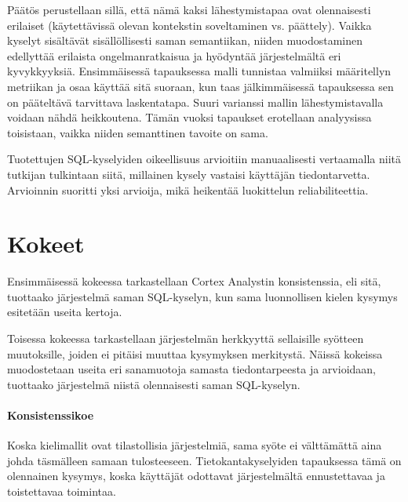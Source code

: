Päätös perustellaan sillä, että nämä kaksi lähestymistapaa ovat olennaisesti erilaiset (käytettävissä olevan kontekstin soveltaminen vs. päättely). Vaikka kyselyt sisältävät sisällöllisesti saman semantiikan, niiden muodostaminen edellyttää erilaista ongelmanratkaisua ja hyödyntää järjestelmältä eri kyvykkyyksiä. Ensimmäisessä tapauksessa malli tunnistaa valmiiksi määritellyn metriikan ja osaa käyttää sitä suoraan, kun taas jälkimmäisessä tapauksessa sen on pääteltävä tarvittava laskentatapa. Suuri varianssi mallin lähestymistavalla voidaan nähdä heikkoutena. Tämän vuoksi tapaukset erotellaan analyysissa toisistaan, vaikka niiden semanttinen tavoite on sama.

Tuotettujen SQL-kyselyiden oikeellisuus arvioitiin manuaalisesti vertaamalla niitä tutkijan tulkintaan siitä, millainen kysely vastaisi käyttäjän tiedontarvetta. Arvioinnin suoritti yksi arvioija, mikä heikentää luokittelun reliabiliteettia.

\section{Kokeet}
Ensimmäisessä kokeessa tarkastellaan Cortex Analystin konsistenssia, eli sitä, tuottaako järjestelmä saman SQL-kyselyn, kun sama luonnollisen kielen kysymys esitetään useita kertoja.

Toisessa kokeessa tarkastellaan järjestelmän herkkyyttä sellaisille syötteen muutoksille, joiden ei pitäisi muuttaa kysymyksen merkitystä. Näissä kokeissa muodostetaan useita eri sanamuotoja samasta tiedontarpeesta ja arvioidaan, tuottaako järjestelmä niistä olennaisesti saman SQL-kyselyn.

\paragraph{Konsistenssikoe}
Koska kielimallit ovat tilastollisia järjestelmiä, sama syöte ei välttämättä aina johda täsmälleen samaan tulosteeseen. Tietokantakyselyiden tapauksessa tämä on olennainen kysymys, koska käyttäjät odottavat järjestelmältä ennustettavaa ja toistettavaa toimintaa.

